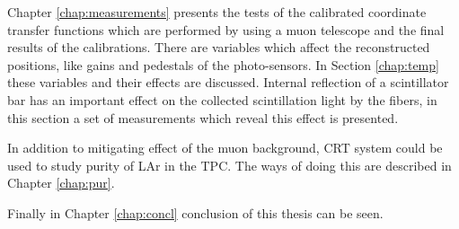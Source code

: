 \documentclass[a4paper]{article}\linespread{1.4}
\begin{document}
Chapter \ref{chap:measurements} presents the tests of the calibrated coordinate transfer functions which are performed by using a muon telescope and the final results of the calibrations. 
There are variables which affect the reconstructed positions, like gains and pedestals of the photo-sensors. In Section \ref{chap:temp} these variables and their effects are discussed. 
Internal reflection of a scintillator bar has an important effect on the collected scintillation light by the fibers, in this section a set of measurements which reveal this effect is presented.

In addition to mitigating effect of the muon background, CRT system could be used to study purity of LAr in the TPC. The ways of doing this are described in Chapter \ref{chap:pur}.

Finally in Chapter \ref{chap:concl} conclusion of this thesis can be seen. 
\end{document}
